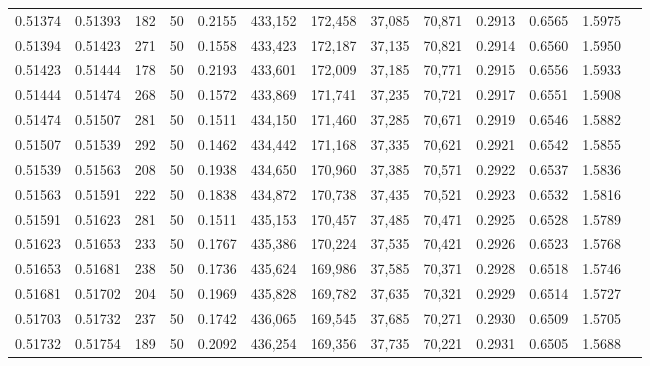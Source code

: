 \begin{tabular}{rrrrrrrrrrrrr}
0.51374 & 0.51393 &   182 &  50 &                                     0.2155 & 433,152 & 172,458 &  37,085 &  70,871 & 0.2913 & 0.6565 & 1.5975 \\
0.51394 & 0.51423 &   271 &  50 &                                     0.1558 & 433,423 & 172,187 &  37,135 &  70,821 & 0.2914 & 0.6560 & 1.5950 \\
0.51423 & 0.51444 &   178 &  50 &                                     0.2193 & 433,601 & 172,009 &  37,185 &  70,771 & 0.2915 & 0.6556 & 1.5933 \\
0.51444 & 0.51474 &   268 &  50 &                                     0.1572 & 433,869 & 171,741 &  37,235 &  70,721 & 0.2917 & 0.6551 & 1.5908 \\
0.51474 & 0.51507 &   281 &  50 &                                     0.1511 & 434,150 & 171,460 &  37,285 &  70,671 & 0.2919 & 0.6546 & 1.5882 \\
0.51507 & 0.51539 &   292 &  50 &                                     0.1462 & 434,442 & 171,168 &  37,335 &  70,621 & 0.2921 & 0.6542 & 1.5855 \\
0.51539 & 0.51563 &   208 &  50 &                                     0.1938 & 434,650 & 170,960 &  37,385 &  70,571 & 0.2922 & 0.6537 & 1.5836 \\
0.51563 & 0.51591 &   222 &  50 &                                     0.1838 & 434,872 & 170,738 &  37,435 &  70,521 & 0.2923 & 0.6532 & 1.5816 \\
0.51591 & 0.51623 &   281 &  50 &                                     0.1511 & 435,153 & 170,457 &  37,485 &  70,471 & 0.2925 & 0.6528 & 1.5789 \\
0.51623 & 0.51653 &   233 &  50 &                                     0.1767 & 435,386 & 170,224 &  37,535 &  70,421 & 0.2926 & 0.6523 & 1.5768 \\
0.51653 & 0.51681 &   238 &  50 &                                     0.1736 & 435,624 & 169,986 &  37,585 &  70,371 & 0.2928 & 0.6518 & 1.5746 \\
0.51681 & 0.51702 &   204 &  50 &                                     0.1969 & 435,828 & 169,782 &  37,635 &  70,321 & 0.2929 & 0.6514 & 1.5727 \\
0.51703 & 0.51732 &   237 &  50 &                                     0.1742 & 436,065 & 169,545 &  37,685 &  70,271 & 0.2930 & 0.6509 & 1.5705 \\
0.51732 & 0.51754 &   189 &  50 &                                     0.2092 & 436,254 & 169,356 &  37,735 &  70,221 & 0.2931 & 0.6505 & 1.5688 \\

\end{tabular}
